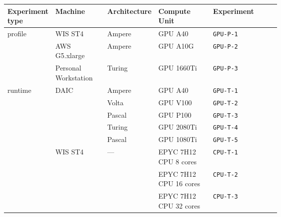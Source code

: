 \begin{tabular}{p{0.15\linewidth}p{0.19\linewidth}p{0.10\linewidth}p{0.20\linewidth}l}
\toprule
Experiment type & Machine & \hspace{0pt}Architecture & Compute Unit & Experiment \\
\midrule\midrule
\multirow[t]{3}{*}{\parbox{1\linewidth}{\vspace{1.5cm}profile}} & WIS ST4 & Ampere & GPU A40 & \texttt{GPU-P-1} \\
\cline{2-5} 
 & AWS G5.xlarge & Ampere & GPU A10G & \texttt{GPU-P-2} \\
\cline{2-5} 
 & Personal Workstation & Turing & GPU 1660Ti & \texttt{GPU-P-3} \\
\cline{1-5}
\multirow[t]{8}{*}{\parbox{1\linewidth}{\vspace{4cm}runtime}} & \multirow[t]{5}{*}{\parbox{1\linewidth}{\vspace{2cm}DAIC}} & Ampere & GPU A40 & \texttt{GPU-T-1} \\

 &  & Volta & GPU V100 & \texttt{GPU-T-2} \\

 &  & Pascal & GPU P100 & \texttt{GPU-T-3} \\

 &  & Turing & GPU 2080Ti & \texttt{GPU-T-4} \\

 &  & Pascal & GPU 1080Ti & \texttt{GPU-T-5} \\
\cline{2-5} 
 & \multirow[t]{3}{*}{\parbox{1\linewidth}{\vspace{2.3cm}WIS ST4}} & \multirow[t]{3}{*}{\parbox{1\linewidth}{\vspace{2.3cm}—}} & EPYC 7H12 CPU 8 cores & \texttt{CPU-T-1} \\

 &  &  & EPYC 7H12 CPU 16 cores & \texttt{CPU-T-2} \\

 &  &  & EPYC 7H12 CPU 32 cores & \texttt{CPU-T-3} \\
\cline{1-5}
\bottomrule
\end{tabular}
